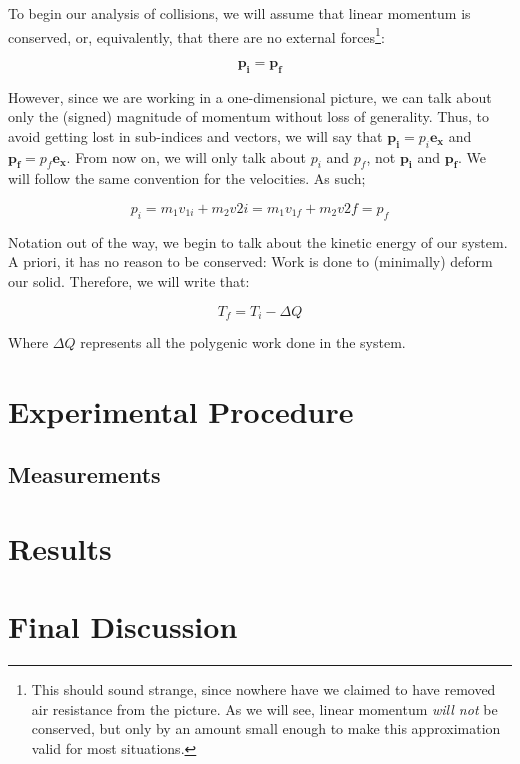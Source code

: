 \documentclass[a4paper,12pt]{article}
\begin{document}
To begin our analysis of collisions, we will assume that linear momentum is conserved, or, equivalently, that there are no external forces\footnote{This should sound strange, since nowhere have we claimed to have removed air resistance from the picture. As we will see, linear momentum \textit{will not} be conserved, but only by an amount small enough to make this approximation valid for most situations.}:


$$\boldsymbol{p_i} = \boldsymbol{p_f}$$

However, since we are working in a one-dimensional picture, we can talk about only the (signed) magnitude of momentum without loss of generality. Thus, to avoid getting lost in sub-indices and vectors, we will say that $\boldsymbol{p_i} = p_i  \boldsymbol{e_x}$ and $\boldsymbol{p_f} = p_f \boldsymbol{e_x}$. From now on, we will only talk about $p_i$ and $p_f$, not $\boldsymbol{p_i}$ and $\boldsymbol{p_f}$.  We will follow the same convention for the velocities. As such;

\begin{equation}
	p_i = m_1 v_{1i} + m_2 v{2i} =m_1 v_{1f} + m_2 v{2f} = p_f
	\label{momcon}
\end{equation}

Notation out of the way, we begin to talk about the kinetic energy of our system. A priori, it has no reason to be conserved: Work is done to (minimally) deform our solid. Therefore, we will write that:

\begin{equation}
	T_f = T_i - \Delta Q
\end{equation}

Where $\Delta Q$ represents all the polygenic work done in the system. 


\section{Experimental Procedure}

\subsection{Measurements}

\section{Results}

\section{Final Discussion}

\printbibliography
\end{document}
